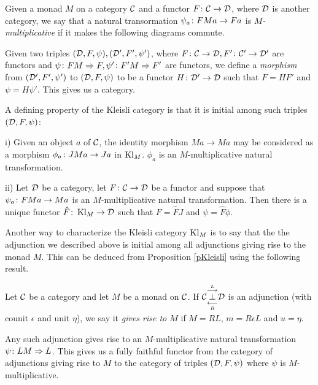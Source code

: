 \documentclass[11pt]{report}
\begin{document}
Given a monad $M$ on a category $\C$ and a functor $F\from \C \to \D$, where $\D$ is another category, we say that a natural transormation $\psi_a \from FMa \to Fa$ is \emph{$M$-multiplicative} if it makes the following diagrams commute.

Given two triples $(\D, F,\psi), (\D', F',\psi')$, where $F\from \C \to \D, F'\from \C'\to\D'$ are functors and $\psi\from FM\Rightarrow F, \psi'\from F'M\Rightarrow F'$ are functors, we define a \emph{morphism} from $(\D', F',\psi')$ to $(\D, F, \psi)$ to be a functor $H\from \D' \to \D$ such that $F=HF'$ and $\psi=H\psi'$.  
This gives us a category.

A defining property of the Kleisli category is that it is initial among such triples $(\D,F,\psi)$:

\begin{proposition}
  i) Given an object $a$ of $\C$, the identity morphism $Ma \to Ma$ may be considered as a morphism $\phi_a \from JMa \to Ja$ in $\Kl_M$.  
  $\phi_a$ is an $M$-multiplicative natural transformation.

  ii) Let $\D$ be a category, let $F\from \C \to \D$ be a functor and suppose that $\psi_a\from FMa \to Ma$ is an $M$-multiplicative natural transformation.
  Then there is a unique functor $\hat{F}\from \Kl_M \to \D$ such that $F=\hat{F}J$ and $\psi = \hat{F}\phi$.
  \label{pKleisli}
\end{proposition}

Another way to characterize the Kleisli category $\Kl_M$ is to say that the the adjunction we described above is initial among all adjunctions giving rise to the monad $M$.  
This can be deduced from Proposition \ref{pKleisli} using the following result.

\begin{lemma}
  Let $\C$ be a category and let $M$ be a monad on $\C$.  
  If $\adjunction{\C}{L}{R}{\D}$ is an adjunction (with counit $\epsilon$ and unit $\eta$), we say it \emph{gives rise to $M$} if $M=RL$, $m=R\epsilon L$ and $u=\eta$.

  Any such adjunction gives rise to an $M$-multiplicative natural transformation $\psi\from LM \Rightarrow L$.  
  This gives us a fully faithful functor from the category of adjunctions giving rise to $M$ to the category of triples $(\D,F,\psi)$ where $\psi$ is $M$-multiplicative.
\end{lemma}
\end{document}
